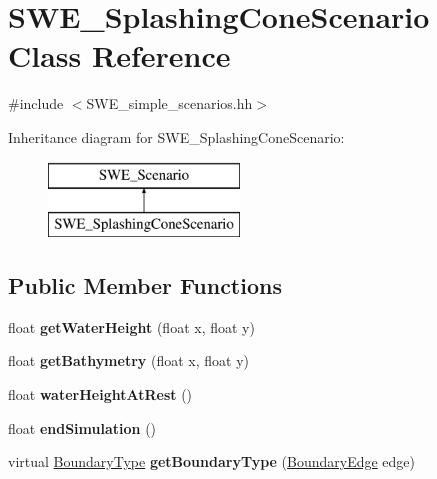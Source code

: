\hypertarget{classSWE__SplashingConeScenario}{\section{S\-W\-E\-\_\-\-Splashing\-Cone\-Scenario Class Reference}
\label{classSWE__SplashingConeScenario}
}


{\ttfamily \#include $<$S\-W\-E\-\_\-simple\-\_\-scenarios.\-hh$>$}

Inheritance diagram for S\-W\-E\-\_\-\-Splashing\-Cone\-Scenario\-:\begin{figure}[H]
\begin{center}
\leavevmode
\includegraphics[height=2.000000cm]{classSWE__SplashingConeScenario}
\end{center}
\end{figure}
\subsection*{Public Member Functions}
\begin{DoxyCompactItemize}
\item 
\hypertarget{classSWE__SplashingConeScenario_a63d7b91dbd7dce764b12ba76eae856b9}{float {\bfseries get\-Water\-Height} (float x, float y)}\label{classSWE__SplashingConeScenario_a63d7b91dbd7dce764b12ba76eae856b9}

\item 
\hypertarget{classSWE__SplashingConeScenario_a54dff1212b8261e89270f9ab10081cb1}{float {\bfseries get\-Bathymetry} (float x, float y)}\label{classSWE__SplashingConeScenario_a54dff1212b8261e89270f9ab10081cb1}

\item 
\hypertarget{classSWE__SplashingConeScenario_a430b3220b49368a4d20b69d71c087604}{float {\bfseries water\-Height\-At\-Rest} ()}\label{classSWE__SplashingConeScenario_a430b3220b49368a4d20b69d71c087604}

\item 
\hypertarget{classSWE__SplashingConeScenario_a464b296fc1905efc2e86aba909cc5188}{float {\bfseries end\-Simulation} ()}\label{classSWE__SplashingConeScenario_a464b296fc1905efc2e86aba909cc5188}

\item 
\hypertarget{classSWE__SplashingConeScenario_a8b8353a1f1cd58d9f211ccb32e4f3b33}{virtual \hyperlink{SWE__Scenario_8hh_af75d5dd7322fa39ed0af4e7839e600f8}{Boundary\-Type} {\bfseries get\-Boundary\-Type} (\hyperlink{SWE__Scenario_8hh_aa5e01e3f7df312f7b9b0d02521141fcc}{Boundary\-Edge} edge)}\label{classSWE__SplashingConeScenario_a8b8353a1f1cd58d9f211ccb32e4f3b33}

\end{DoxyCompactItemize}


